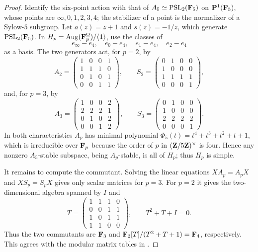 \begin{proof}
Identify the six-point action with that of
$A_5\simeq\operatorname{PSL}_2(\mathbf F_5)$ on
$\mathbf P^1(\mathbf F_5)$, whose points are $\infty,0,1,2,3,4$; the stabilizer of a
point is the
normalizer of a Sylow-$5$ subgroup.  Let
$a(z)=z+1$ and $s(z)=-1/z$, which generate $\operatorname{PSL}_2(\mathbf F_5)$.
In $H_p=\operatorname{Aug}(\mathbf F_p^\Omega)/\langle\mathbf1\rangle$, use the
classes of
\[
 e_\infty-e_4,\quad e_0-e_4,\quad e_1-e_4,\quad e_2-e_4
\]
as a basis.  The two generators act, for $p=2$, by
\[
 A_2=\begin{pmatrix}
 1&0&0&1\\1&1&1&0\\0&1&0&1\\0&0&1&1
 \end{pmatrix},\qquad
 S_2=\begin{pmatrix}
 0&1&0&0\\1&0&0&0\\1&1&1&1\\0&0&0&1
 \end{pmatrix},
\]
and, for $p=3$, by
\[
 A_3=\begin{pmatrix}
 1&0&0&2\\2&2&2&1\\0&1&0&2\\0&0&1&2
 \end{pmatrix},\qquad
 S_3=\begin{pmatrix}
 0&1&0&0\\1&0&0&0\\2&2&2&2\\0&0&0&1
 \end{pmatrix}.
\]
In both characteristics $A_p$ has minimal polynomial
$\Phi_5(t)=t^4+t^3+t^2+t+1$, which is irreducible over $\mathbf F_p$ because the
order of $p$ in $(\mathbf Z/5\mathbf Z)^\times$ is four.  Hence any nonzero
$A_5$-stable subspace, being $A_p$-stable, is all of $H_p$; thus $H_p$ is
simple.

It remains to compute the commutant.  Solving the linear equations
$XA_p=A_pX$ and $XS_p=S_pX$ gives only scalar matrices for $p=3$.  For
$p=2$ it gives the two-dimensional algebra spanned by $I$ and
\[
 T=\begin{pmatrix}
 1&1&1&0\\0&0&1&1\\1&0&1&1\\1&1&0&0
 \end{pmatrix},
 \qquad T^2+T+I=0.
\]
Thus the two commutants are $\mathbf F_3$ and $\mathbf F_2[T]/(T^2+T+1)=\mathbf F_4$,
respectively.  This agrees with the modular matrix tables in
\cite{AtlasBrauer}.
\end{proof}

